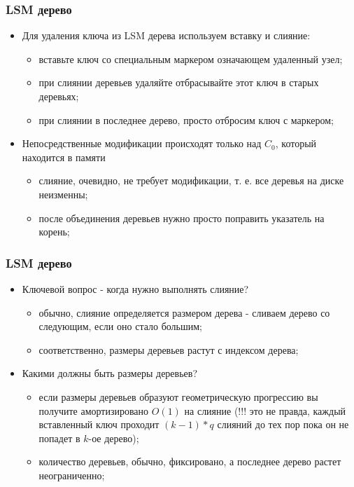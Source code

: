\begin{frame}
\frametitle{LSM дерево}
\begin{itemize}
  \item<1-> Для удаления ключа из LSM дерева используем вставку и слияние:
    \begin{itemize}
      \item вставьте ключ со специальным маркером означающем удаленный узел;
      \item при слиянии деревьев удаляйте отбрасывайте этот ключ в старых деревьях;
      \item при слиянии в последнее дерево, просто отбросим ключ с маркером;
    \end{itemize}
  \item<2-> Непосредственные модификации происходят только над $C_0$, который находится в памяти
    \begin{itemize}
      \item слияние, очевидно, не требует модификации, т. е. все деревья на диске неизменны;
      \item после объединения деревьев нужно просто поправить указатель на корень;
    \end{itemize}
\end{itemize}
\end{frame}

\begin{frame}
\frametitle{LSM дерево}
\begin{itemize}
  \item<1-> Ключевой вопрос - когда нужно выполнять слияние?
    \begin{itemize}
      \item обычно, слияние определяется размером дерева - сливаем дерево со следующим, если оно стало большим;
      \item соответственно, размеры деревьев растут с индексом дерева;
    \end{itemize}
  \item<2-> Какими должны быть размеры деревьев?
    \begin{itemize}
      \item если размеры деревьев образуют геометрическую прогрессию вы получите амортизировано $O(1)$ на слияние (!!! это не правда, каждый вставленный ключ проходит $(k-1) * q$ слияний до тех пор пока он не попадет в $k$-ое дерево);
      \item количество деревьев, обычно, фиксировано, а последнее дерево растет неограниченно;
    \end{itemize}
\end{itemize}
\end{frame}

